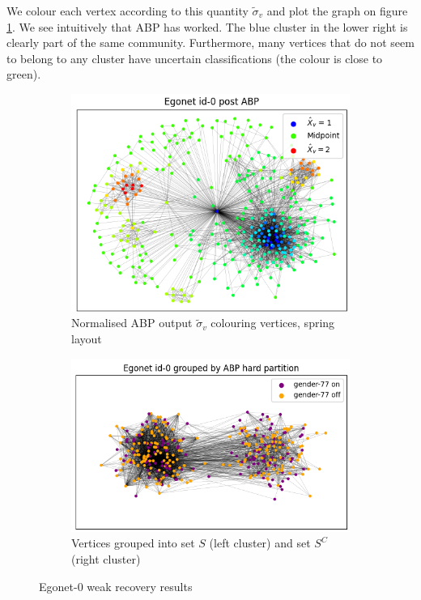 \documentclass[11pt]{article}
\newcommand{\figwidth}{0.7\linewidth}
\begin{document}
\begin{multicols*}{2}
We colour each vertex according to this quantity $\tilde{\sigma}_v$ and plot the graph on figure \ref{fig:abp-output-norm}. We see intuitively that ABP has worked. The blue cluster in the lower right is clearly part of the same community. Furthermore, many vertices that do not seem to belong to any cluster have uncertain classifications (the colour is close to green).
%
\begin{figure}[H]
	\centering
	\begin{subfigure}{\figwidth}
		\includegraphics[width=\linewidth]{ego-0-abp.png}
		\caption{Normalised ABP output $\tilde{\sigma}_v$ colouring vertices, spring layout}
		\label{fig:abp-output-norm}
	\end{subfigure}
	\begin{subfigure}{\figwidth}
		\includegraphics[width=\linewidth]{ego-0-abp-by-gender.png}
		\caption{Vertices grouped into set $S$ (left cluster) and set $S^C$ (right cluster)}
		\label{fig:abp-output-by-gender}
	\end{subfigure}
	\caption{Egonet-0 weak recovery results}
\end{figure}


\end{multicols*}
\end{document}
